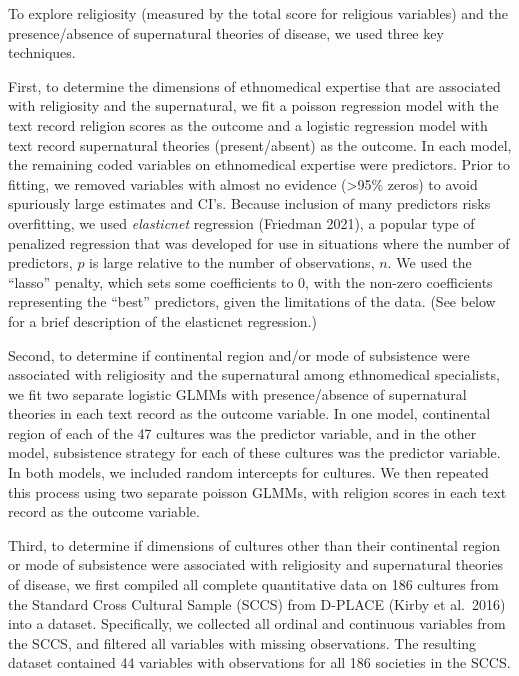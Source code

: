 \documentclass[
]{article}
\begin{document}
To explore religiosity (measured by the total score for religious variables) and the presence/absence of supernatural theories of disease, we used three key techniques.

First, to determine the dimensions of ethnomedical expertise that are associated with religiosity and the supernatural, we fit a poisson regression model with the text record religion scores as the outcome and a logistic regression model with text record supernatural theories (present/absent) as the outcome. In each model, the remaining coded variables on ethnomedical expertise were predictors. Prior to fitting, we removed variables with almost no evidence (\textgreater95\% zeros) to avoid spuriously large estimates and CI's. Because inclusion of many predictors risks overfitting, we used \emph{elasticnet} regression (Friedman 2021), a popular type of penalized regression that was developed for use in situations where the number of predictors, \(p\) is large relative to the number of observations, \(n\). We used the ``lasso'' penalty, which sets some coefficients to 0, with the non-zero coefficients representing the ``best'' predictors, given the limitations of the data. (See below for a brief description of the elasticnet regression.)

Second, to determine if continental region and/or mode of subsistence were associated with religiosity and the supernatural among ethnomedical specialists, we fit two separate logistic GLMMs with presence/absence of supernatural theories in each text record as the outcome variable. In one model, continental region of each of the 47 cultures was the predictor variable, and in the other model, subsistence strategy for each of these cultures was the predictor variable. In both models, we included random intercepts for cultures. We then repeated this process using two separate poisson GLMMs, with religion scores in each text record as the outcome variable.

Third, to determine if dimensions of cultures other than their continental region or mode of subsistence were associated with religiosity and supernatural theories of disease, we first compiled all complete quantitative data on 186 cultures from the Standard Cross Cultural Sample (SCCS) from D-PLACE (Kirby et al.~2016) into a dataset. Specifically, we collected all ordinal and continuous variables from the SCCS, and filtered all variables with missing observations. The resulting dataset contained 44 variables with observations for all 186 societies in the SCCS.
\end{document}
